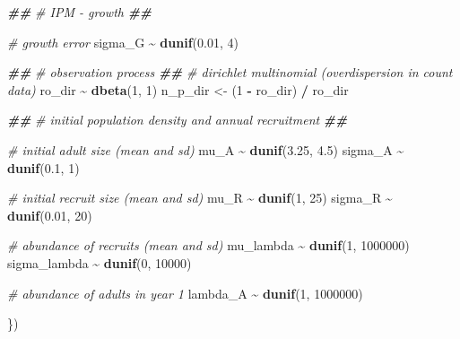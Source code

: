 \documentclass[
]{article}
\newenvironment{Shaded}{\begin{snugshade}}{\end{snugshade}}
\newcommand{\CommentTok}[1]{\textcolor[rgb]{0.56,0.35,0.01}{\textit{#1}}}
\newcommand{\DecValTok}[1]{\textcolor[rgb]{0.00,0.00,0.81}{#1}}
\newcommand{\DocumentationTok}[1]{\textcolor[rgb]{0.56,0.35,0.01}{\textbf{\textit{#1}}}}
\newcommand{\FloatTok}[1]{\textcolor[rgb]{0.00,0.00,0.81}{#1}}
\newcommand{\FunctionTok}[1]{\textcolor[rgb]{0.13,0.29,0.53}{\textbf{#1}}}
\newcommand{\NormalTok}[1]{#1}
\newcommand{\OtherTok}[1]{\textcolor[rgb]{0.56,0.35,0.01}{#1}}
\newcommand{\SpecialCharTok}[1]{\textcolor[rgb]{0.81,0.36,0.00}{\textbf{#1}}}
\begin{document}
\begin{Shaded}
\begin{Highlighting}[]
  \DocumentationTok{\#\#}
  \CommentTok{\# IPM {-} growth}
  \DocumentationTok{\#\#}
  
  \CommentTok{\# growth error}
\NormalTok{  sigma\_G }\SpecialCharTok{\textasciitilde{}} \FunctionTok{dunif}\NormalTok{(}\FloatTok{0.01}\NormalTok{, }\DecValTok{4}\NormalTok{)}
  
  \DocumentationTok{\#\#}
  \CommentTok{\# observation process}
  \DocumentationTok{\#\#}
  \CommentTok{\# dirichlet multinomial (overdispersion in count data)}
\NormalTok{  ro\_dir }\SpecialCharTok{\textasciitilde{}} \FunctionTok{dbeta}\NormalTok{(}\DecValTok{1}\NormalTok{, }\DecValTok{1}\NormalTok{)}
\NormalTok{  n\_p\_dir }\OtherTok{\textless{}{-}}\NormalTok{ (}\DecValTok{1} \SpecialCharTok{{-}}\NormalTok{ ro\_dir) }\SpecialCharTok{/}\NormalTok{ ro\_dir}
  
  \DocumentationTok{\#\#}
  \CommentTok{\# initial population density and annual recruitment}
  \DocumentationTok{\#\#}
  
  \CommentTok{\# initial adult size (mean and sd)}
\NormalTok{  mu\_A }\SpecialCharTok{\textasciitilde{}} \FunctionTok{dunif}\NormalTok{(}\FloatTok{3.25}\NormalTok{, }\FloatTok{4.5}\NormalTok{)}
\NormalTok{  sigma\_A }\SpecialCharTok{\textasciitilde{}} \FunctionTok{dunif}\NormalTok{(}\FloatTok{0.1}\NormalTok{, }\DecValTok{1}\NormalTok{)}
  
  \CommentTok{\# initial recruit size (mean and sd)}
\NormalTok{  mu\_R }\SpecialCharTok{\textasciitilde{}} \FunctionTok{dunif}\NormalTok{(}\DecValTok{1}\NormalTok{, }\DecValTok{25}\NormalTok{)}
\NormalTok{  sigma\_R }\SpecialCharTok{\textasciitilde{}} \FunctionTok{dunif}\NormalTok{(}\FloatTok{0.01}\NormalTok{, }\DecValTok{20}\NormalTok{)}
  
  \CommentTok{\# abundance of recruits (mean and sd)}
\NormalTok{  mu\_lambda }\SpecialCharTok{\textasciitilde{}} \FunctionTok{dunif}\NormalTok{(}\DecValTok{1}\NormalTok{, }\DecValTok{1000000}\NormalTok{)}
\NormalTok{  sigma\_lambda }\SpecialCharTok{\textasciitilde{}} \FunctionTok{dunif}\NormalTok{(}\DecValTok{0}\NormalTok{, }\DecValTok{10000}\NormalTok{)}
  
  \CommentTok{\# abundance of adults in year 1}
\NormalTok{  lambda\_A }\SpecialCharTok{\textasciitilde{}} \FunctionTok{dunif}\NormalTok{(}\DecValTok{1}\NormalTok{, }\DecValTok{1000000}\NormalTok{)}
  
  
\NormalTok{\})}
\end{Highlighting}
\end{Shaded}
\end{document}
